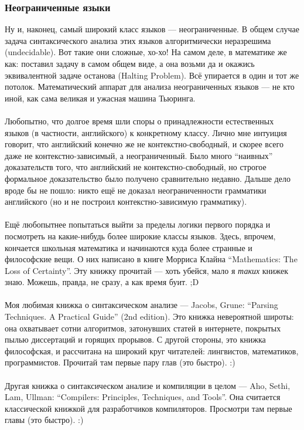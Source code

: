 \documentclass[11pt]{book}
\begin{document}
\subsubsection{Неограниченные языки}
Ну и, наконец, самый широкий класс языков --- неограниченные.
В общем случае задача синтаксического анализа этих языков алгоритмически неразрешима (undecidable).
Вот такие они сложные, хо-хо!
На самом деле, в математике же как: поставил задачу в самом общем виде, а она возьми да и окажись эквивалентной задаче останова (Halting Problem).
Всё упирается в один и тот же потолок.
Математический аппарат для анализа неограниченных языков --- не кто иной, как сама великая и ужасная машина Тьюринга.
\\ \\
Любопытно, что долгое время шли споры о принадлежности естественных языков (в частности, английского) к конкретному классу.
Лично мне интуиция говорит, что английский конечно же не контекстно-свободный, и скорее всего даже не контекстно-зависимый, а неограниченный.
Было много ``наивных'' доказательств того, что английский не контекстно-свободный,
но строгое формальное доказательство было получено сравнительно недавно.
Дальше дело вроде бы не пошло: никто ещё не доказал неограниченности грамматики английского (но и не построил контекстно-зависимую грамматику).
\\ \\
Ещё любопытнее попытаться выйти за пределы логики первого порядка и посмотреть на какие-нибудь более широкие классы языков.
Здесь, впрочем, кончается школьная математика и начинаются куда более странные и философские вещи.
О них написано в книге Морриса Клайна ``Mathematics: The Loss of Certainty''.
Эту книжку прочитай --- хоть убейся, мало я \emph{таких} книжек знаю.
Можешь, правда, не сразу, а как время буит. ;D
\\ \\
Моя любимая книжка о синтаксическом анализе --- Jacobs, Grune: ``Parsing Techniques. A Practical Guide'' (2nd edition).
Это книжка невероятной широты: она охватывает сотни алгоритмов, затонувших статей в интернете, покрытых пылью диссертаций и горящих прорывов.
С другой стороны, это книжка философская, и рассчитана на широкий круг читателей: лингвистов, математиков, программистов.
Прочитай там первые пару глав (это быстро). :)
\\ \\
Другая книжка о синтаксическом анализе и компиляции в целом --- Aho, Sethi, Lam, Ullman: ``Compilers: Principles, Techniques, and Tools''.
Она считается классической книжкой для разработчиков компиляторов.
Просмотри там первые главы (это быстро). :)
\end{document}
